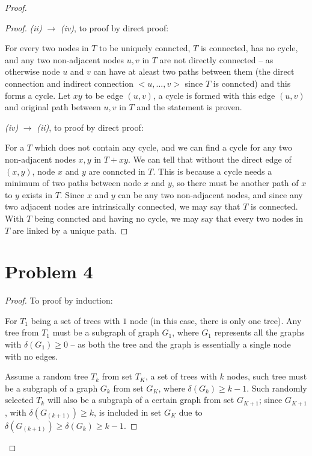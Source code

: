 \documentclass[12pt]{article}
\begin{document}
\begin{proof}
\begin{proof}
\textit{(ii)} $\longrightarrow$ \textit{(iv)}, to proof by direct proof:


For every two nodes in $T$ to be uniquely conncted, $T$ is connected, has no cycle, and any two non-adjacent nodes $u, v$ in $T$ are not directly connected -- as otherwise node $u$ and $v$ can have at aleast two paths between them (the direct connection and indirect connection $<u, ..., v>$ since $T$ is conncted) and this forms a cycle. Let $xy$ to be edge $(u, v)$, a cycle is formed with this edge $(u, v)$ and original path between $u, v$ in $T$ and the statement is proven.


\textit{(iv)} $\longrightarrow$ \textit{(ii)}, to proof by direct proof:

For a $T$ which does not contain any cycle, and we can find a cycle for any two non-adjacent nodes $x, y$ in $T+xy$. We can tell that without the direct edge of $(x,y)$, node $x$ and $y$ are conncted in $T$. This is because a cycle needs a minimum of two paths between node $x$ and $y$, so there must be another path of $x$ to $y$ exists in $T$. Since $x$ and $y$ can be any two non-adjacent nodes, and since any two adjacent nodes are intrinsically connected, we may say that $T$ is connected. With $T$ being conncted and having no cycle, we may say that every two nodes in $T$ are linked by a unique path.



\end{proof}

\section{Problem 4}


\begin{proof}
To proof by induction: \newline

For $T_1$ being a set of trees with $1$ node (in this case, there is only one tree). Any tree from $T_1$ must be a subgraph of graph $G_1$, where $G_1$ represents all the graphs with $\delta(G_1) \geq 0$ -- as both the tree and the graph is essentially a single node with no edges. \newline

Assume a random tree $T_k$ from set $T_K$, a set of trees with $k$ nodes, such tree must be a subgraph of a graph $G_k$ from set $G_K$, where $\delta(G_k) \geq k - 1$. Such randomly selected $T_k$ will also be a subgraph of a certain graph from set $G_{K+1}$; since $G_{K+1}$, with $\delta(G_(k+1)) \geq k$, is included in set $G_K$ due to $\delta(G_(k+1)) \geq \delta(G_k) \geq k - 1$.\newline


\end{proof}
\end{proof}
\end{document}
